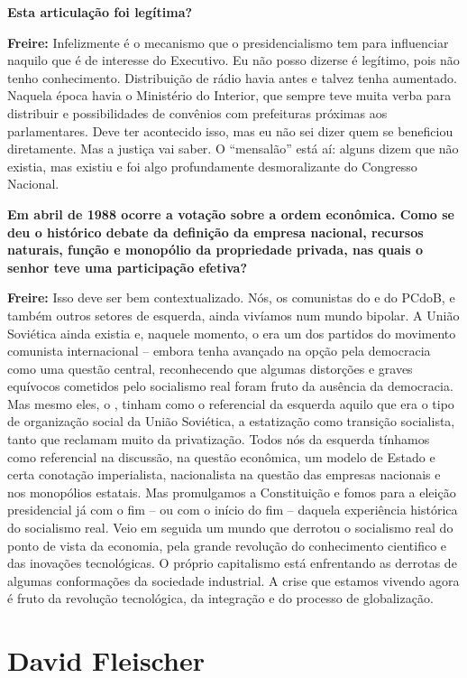 \textbf{Esta articulação foi legítima?}

\textbf{Freire:} Infelizmente é o mecanismo que o presidencialismo tem
para influenciar naquilo que é de interesse do Executivo. Eu não posso
dizerse é legítimo, pois não tenho conhecimento. Distribuição de rádio
havia antes e talvez tenha aumentado. Naquela época havia o Ministério
do Interior, que sempre teve muita verba para distribuir e
possibilidades de convênios com prefeituras próximas aos parlamentares.
Deve ter acontecido isso, mas eu não sei dizer quem se beneficiou
diretamente. Mas a justiça vai saber. O ``mensalão'' está aí: alguns
dizem que não existia, mas existiu e foi algo profundamente
desmoralizante do Congresso Nacional.

\textbf{Em abril de 1988 ocorre a votação sobre a ordem econômica. Como
se deu o histórico debate da definição da empresa nacional, recursos
naturais, função e monopólio da propriedade privada, nas quais o senhor
teve uma participação efetiva?}

\textbf{Freire:} Isso deve ser bem contextualizado. Nós, os comunistas
do  e do PCdoB, e também outros setores de esquerda, ainda vivíamos
num mundo bipolar. A União Soviética ainda existia e, naquele momento, o
 era um dos partidos do movimento comunista internacional -- embora
tenha avançado na opção pela democracia como uma questão central,
reconhecendo que algumas distorções e graves equívocos cometidos pelo
socialismo real foram fruto da ausência da democracia. Mas mesmo eles, o
, tinham como o referencial da esquerda aquilo que era o tipo de
organização social da União Soviética, a estatização como transição
socialista, tanto que reclamam muito da privatização. Todos nós da
esquerda tínhamos como referencial na discussão, na questão econômica,
um modelo de Estado e certa conotação imperialista, nacionalista na
questão das empresas nacionais e nos monopólios estatais. Mas
promulgamos a Constituição e fomos para a eleição presidencial já com o
fim -- ou com o início do fim -- daquela experiência histórica do
socialismo real. Veio em seguida um mundo que derrotou o socialismo real
do ponto de vista da economia, pela grande revolução do conhecimento
cientifico e das inovações tecnológicas. O próprio capitalismo está
enfrentando as derrotas de algumas conformações da sociedade industrial.
A crise que estamos vivendo agora é fruto da revolução tecnológica, da
integração e do processo de globalização.

\chapter{David Fleischer}

